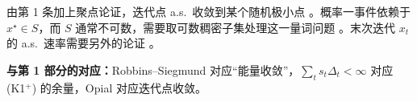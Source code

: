 \documentclass[11pt]{ctexart}
\newcommand{\E}{\mathbb{E}}
\begin{document}
由第 1 条加上聚点论证，迭代点 a.s.\ 收敛到某个随机极小点 \citep{opial1967,combettes2015}。概率一事件依赖于 $x^\star\in S$，而 $S$ 通常不可数，需要取可数稠密子集处理这一量词问题 \citep{combettes2015}。末次迭代 $x_t$ 的 a.s.\ 速率需要另外的论证 \citep{sebbouh2021,liu2022}。

\textbf{与第 1 部分的对应：}Robbins--Siegmund 对应``能量收敛''，$\sum_t s_t\Delta_t<\infty$ 对应 (K1$^+$) 的余量，Opial 对应迭代点收敛。





\end{document}
